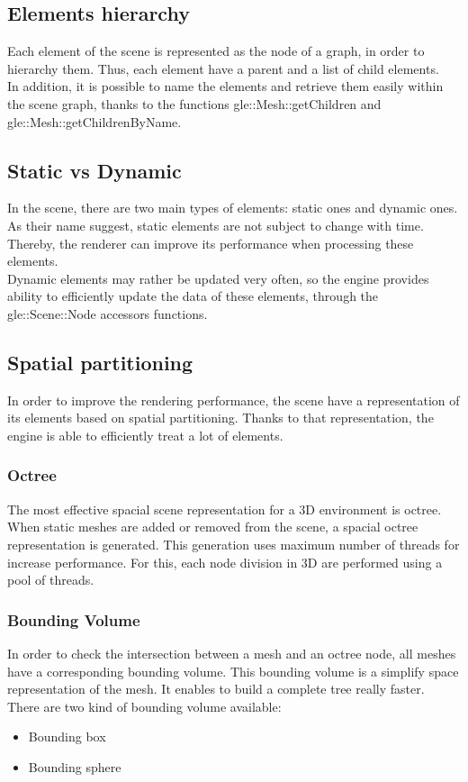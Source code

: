 \documentclass [a4 paper,11pt]{report}
\begin{document}
\subsection{Elements hierarchy}
Each element of the scene is represented as the node of a graph, in order to hierarchy them. Thus, each element have a parent and a list of child elements.\\
In addition, it is possible to name the elements and retrieve them easily within the scene graph, thanks to the functions gle::Mesh::getChildren and gle::Mesh::getChildrenByName.

\subsection{Static vs Dynamic}
In the scene, there are two main types of elements: static ones and dynamic ones.\\
As their name suggest, static elements are not subject to change with time. Thereby, the renderer can improve its performance when processing these elements.\\
Dynamic elements may rather be updated very often, so the engine provides ability to efficiently update the data of these elements, through the gle::Scene::Node accessors functions.

\subsection{Spatial partitioning}
In order to improve the rendering performance, the scene have a representation of its elements based on spatial partitioning. Thanks to that representation, the engine is able to efficiently treat a lot of elements.\\
\subsubsection{Octree}
The most effective spacial scene representation for a 3D environment is octree. When static meshes are added or removed from the scene, a spacial octree representation is generated.
This generation uses maximum number of threads for increase performance. For this, each node division in 3D are performed using a pool of threads.
\subsubsection{Bounding Volume}
In order to check the intersection between a mesh and an octree node, all meshes have a corresponding bounding volume. This bounding volume is a simplify space representation of the mesh.
It enables to build a complete tree really faster.
There are two kind of bounding volume available:
\begin{itemize}
\item Bounding box
\item Bounding sphere
\end{itemize}
\end{document}
